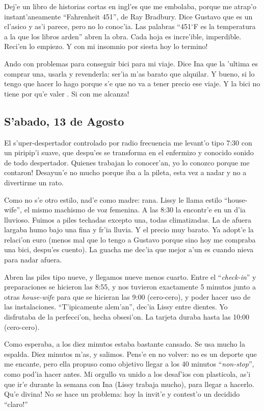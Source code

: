 Dej'e un libro de historias cortas en ingl'es que me embolaba, porque me atrap'o
instant'aneamente ``Fahrenheit 451'', de Ray Bradbury. Dice Gustavo que es un
cl'asico y as'i parece, pero no lo conoc'ia. Las palabras ``451$^{\circ}$F es la
temperatura a la que los libros arden'' abren la obra. Cada hoja es incre'ible,
imperdible. Reci'en lo empiezo. \textexclamdown Y con mi insomnio por siesta hoy
lo termino!

Ando con problemas para conseguir bici para mi viaje. Dice Ina que la
'ultima es comprar una, usarla y revenderla: ser'ia m'as barato que alquilar. Y
bueno, si lo tengo que hacer lo hago porque s'e que no va a tener precio ese
viaje. Y la bici no tiene por qu'e valer . \textexclamdown
Si con  me alcanza!

\subsection*{S'abado, 13 de Agosto}

El s'uper-despertador controlado por radio frecuencia me levant'o tipo 7:30 con
un piripip'i suave, que despu'es se transforma en el enfermizo y conocido sonido
de todo despertador. Quienes trabajan lo conocer'an, \textexclamdown yo lo
conozco porque me contaron! Desayun'e no mucho porque iba a la pileta, esta vez
a nadar y no a divertirme un rato.

Como no s'e otro estilo, nad'e como madre: rana. Lissy le llama estilo
``house-wife'', el mismo machismo de voz femenina. A las 8:30 la encontr'e en un
d'ia lluvioso. Fuimos a piles techadas excepto una, todas climatizadas. La de
afuera largaba humo bajo una fina y fr'ia lluvia. Y el precio muy barato. Ya
adopt'e la relaci'on euro (menos mal que lo tengo a Gustavo porque sino hoy me
compraba una bici, despu'es cuento). La guacha me dec'ia que mejor a'un es
cuando nieva para nadar afuera.

Abren las piles tipo nueve, y llegamos nueve menos cuarto. Entre el
``\emph{check-in}'' y preparaciones se hicieron las 8:55, y nos tuvieron
exactamente 5 minutos junto a otras \emph{house-wife} para que se hicieran las
9:00 (cero-cero), y poder hacer uso de las instalaciones. ``T'ipicamente
alem'an'', dec'ia Lissy entre dientes. Yo disfrutaba de la perfecci'on, hecha
obsesi'on. La tarjeta duraba hasta las 10:00 (cero-cero).

Como esperaba, a los diez minutos estaba bastante cansado. Se usa mucho la
espalda. Diez minutos m'as, y salimos. Pens'e en no volver: no es un deporte que
me encante, pero ella propuso como objetivo llegar a los 40 minutos
``\emph{non-stop}'', como pod'ia hacer antes. Mi orgullo va unido a los
desaf'ios con plasticola, as'i que ir'e durante la semana con Ina (Lissy trabaja
mucho), para llegar a hacerlo. \textexclamdown Qu'e divina! No se hace un
problema: hoy la invit'e y contest'o un decidido ``\textexclamdown claro!''\\

